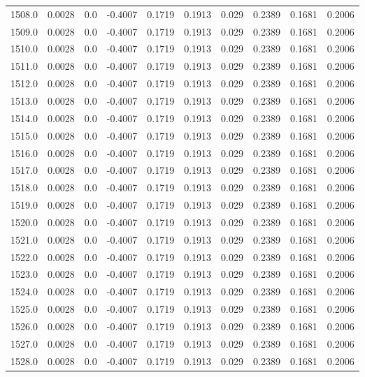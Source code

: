 \begin{longtable}{lrrrrrrrrr}
1508.0 & 0.0028 & 0.0 & -0.4007 & 0.1719 & 0.1913 & 0.029 & 0.2389 & 0.1681 & 0.2006 \\
1509.0 & 0.0028 & 0.0 & -0.4007 & 0.1719 & 0.1913 & 0.029 & 0.2389 & 0.1681 & 0.2006 \\
1510.0 & 0.0028 & 0.0 & -0.4007 & 0.1719 & 0.1913 & 0.029 & 0.2389 & 0.1681 & 0.2006 \\
1511.0 & 0.0028 & 0.0 & -0.4007 & 0.1719 & 0.1913 & 0.029 & 0.2389 & 0.1681 & 0.2006 \\
1512.0 & 0.0028 & 0.0 & -0.4007 & 0.1719 & 0.1913 & 0.029 & 0.2389 & 0.1681 & 0.2006 \\
1513.0 & 0.0028 & 0.0 & -0.4007 & 0.1719 & 0.1913 & 0.029 & 0.2389 & 0.1681 & 0.2006 \\
1514.0 & 0.0028 & 0.0 & -0.4007 & 0.1719 & 0.1913 & 0.029 & 0.2389 & 0.1681 & 0.2006 \\
1515.0 & 0.0028 & 0.0 & -0.4007 & 0.1719 & 0.1913 & 0.029 & 0.2389 & 0.1681 & 0.2006 \\
1516.0 & 0.0028 & 0.0 & -0.4007 & 0.1719 & 0.1913 & 0.029 & 0.2389 & 0.1681 & 0.2006 \\
1517.0 & 0.0028 & 0.0 & -0.4007 & 0.1719 & 0.1913 & 0.029 & 0.2389 & 0.1681 & 0.2006 \\
1518.0 & 0.0028 & 0.0 & -0.4007 & 0.1719 & 0.1913 & 0.029 & 0.2389 & 0.1681 & 0.2006 \\
1519.0 & 0.0028 & 0.0 & -0.4007 & 0.1719 & 0.1913 & 0.029 & 0.2389 & 0.1681 & 0.2006 \\
1520.0 & 0.0028 & 0.0 & -0.4007 & 0.1719 & 0.1913 & 0.029 & 0.2389 & 0.1681 & 0.2006 \\
1521.0 & 0.0028 & 0.0 & -0.4007 & 0.1719 & 0.1913 & 0.029 & 0.2389 & 0.1681 & 0.2006 \\
1522.0 & 0.0028 & 0.0 & -0.4007 & 0.1719 & 0.1913 & 0.029 & 0.2389 & 0.1681 & 0.2006 \\
1523.0 & 0.0028 & 0.0 & -0.4007 & 0.1719 & 0.1913 & 0.029 & 0.2389 & 0.1681 & 0.2006 \\
1524.0 & 0.0028 & 0.0 & -0.4007 & 0.1719 & 0.1913 & 0.029 & 0.2389 & 0.1681 & 0.2006 \\
1525.0 & 0.0028 & 0.0 & -0.4007 & 0.1719 & 0.1913 & 0.029 & 0.2389 & 0.1681 & 0.2006 \\
1526.0 & 0.0028 & 0.0 & -0.4007 & 0.1719 & 0.1913 & 0.029 & 0.2389 & 0.1681 & 0.2006 \\
1527.0 & 0.0028 & 0.0 & -0.4007 & 0.1719 & 0.1913 & 0.029 & 0.2389 & 0.1681 & 0.2006 \\
1528.0 & 0.0028 & 0.0 & -0.4007 & 0.1719 & 0.1913 & 0.029 & 0.2389 & 0.1681 & 0.2006 \\

\end{longtable}
